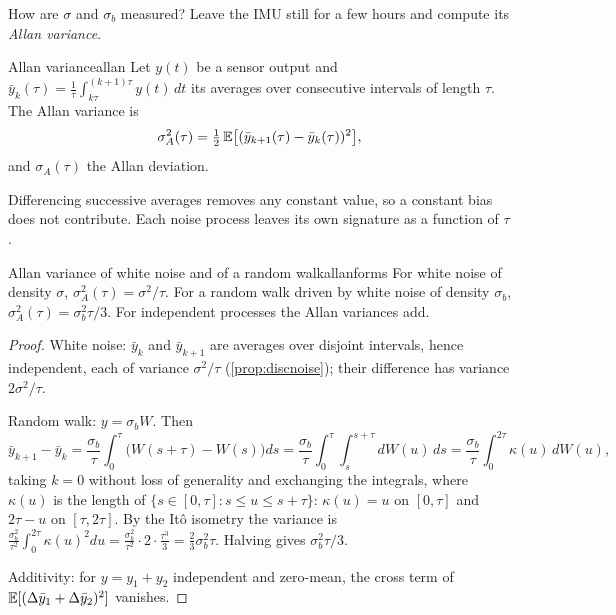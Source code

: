 How are $\sigma$ and $\sigma_b$ measured? Leave the IMU still for a few
hours and compute its \emph{Allan variance}.

\begin{definition}{Allan variance}{allan}
Let $y(t)$ be a sensor output and $\bar y_k(\tau)=\frac1\tau
\int_{k\tau}^{(k+1)\tau}y(t)\,dt$ its averages over consecutive
intervals of length $\tau$. The Allan variance is
\begin{equation}\label{eq:allan}
\sigma_A^2(\tau)=\tfrac12\,\mathbb{E}\bigl[(\bar y_{k+1}(\tau)-\bar y_k(\tau))^2
\bigr],
\end{equation}
and $\sigma_A(\tau)$ the Allan deviation.
\end{definition}

Differencing successive averages removes any constant value, so a
constant bias does not contribute. Each noise process leaves its own
signature as a function of $\tau$.

\begin{proposition}{Allan variance of white noise and of a random
walk}{allanforms}
For white noise of density $\sigma$, $\sigma_A^2(\tau)=\sigma^2/\tau$.
For a random walk driven by white noise of density $\sigma_b$,
$\sigma_A^2(\tau)=\sigma_b^2\tau/3$. For independent processes the Allan
variances add.
\end{proposition}

\begin{proof}
White noise: $\bar y_k$ and $\bar y_{k+1}$ are averages over disjoint
intervals, hence independent, each of variance $\sigma^2/\tau$
(\cref{prop:discnoise}); their difference has variance $2\sigma^2/\tau$.

Random walk: $y=\sigma_bW$. Then
\[
\bar y_{k+1}-\bar y_k=\frac{\sigma_b}\tau\int_0^\tau\bigl(W(s+\tau)-
W(s)\bigr)ds=\frac{\sigma_b}\tau\int_0^\tau\!\!\int_s^{s+\tau}dW(u)\,ds
=\frac{\sigma_b}\tau\int_0^{2\tau}\kappa(u)\,dW(u),
\]
taking $k=0$ without loss of generality and exchanging the integrals,
where $\kappa(u)$ is the length of $\{s\in[0,\tau]:s\le u\le s+\tau\}$:
$\kappa(u)=u$ on $[0,\tau]$ and $2\tau-u$ on $[\tau,2\tau]$. By the
It\^o isometry the variance is $\frac{\sigma_b^2}{\tau^2}\int_0^{2\tau}
\kappa(u)^2du=\frac{\sigma_b^2}{\tau^2}\cdot2\cdot\frac{\tau^3}3=
\frac23\sigma_b^2\tau$. Halving gives $\sigma_b^2\tau/3$.

Additivity: for $y=y_1+y_2$ independent and zero-mean, the cross term of
$\mathbb{E}[(\Delta\bar y_1+\Delta\bar y_2)^2]$ vanishes.
\end{proof}

